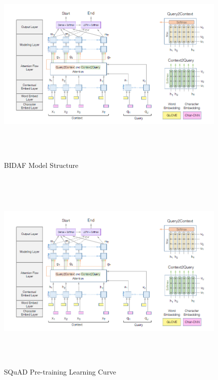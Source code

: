 \documentclass[12pt, a4paper]{article}
\begin{document}
	\begin{figure}
		\includegraphics[width=\textwidth,height=10cm]{images/bidaf.png}
		\caption{BIDAF Model Structure}
	\end{figure}
	
	\begin{figure}
		\includegraphics[width=\textwidth,height=10cm]{images/bidaf.png}
		\caption{SQuAD Pre-training Learning Curve}
	\end{figure}
	
\end{document}
